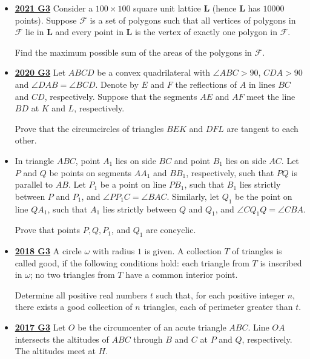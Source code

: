 \documentclass[11pt]{scrartcl}
\begin{document}
\begin{itemize}[leftmargin=*]
    Prove that the following three lines are concurrent: line $CD$, the tangent of circle $ANQ$ at point $A$, and the tangent to circle $BMP$ at point $B$.
\item \href{https://artofproblemsolving.com/community/c6h2882549p25627540}{\textbf{2021 G3}} Consider a $100\times 100$ square unit lattice $\textbf{L}$ (hence $\textbf{L}$ has $10000$ points). Suppose $\mathcal{F}$ is a set of polygons such that all vertices of polygons in $\mathcal{F}$ lie in $\textbf{L}$ and every point in $\textbf{L}$ is the vertex of exactly one polygon in $\mathcal{F}.$ 

Find the maximum possible sum of the areas of the polygons in $\mathcal{F}.$
\item \href{https://artofproblemsolving.com/community/c6h2625881p22698213}{\textbf{2020 G3}} Let $ABCD$ be a convex quadrilateral with $\angle ABC>90$, $CDA>90$ and $\angle DAB=\angle BCD$. Denote by $E$ and $F$ the reflections of $A$ in lines $BC$ and $CD$, respectively. Suppose that the segments $AE$ and $AF$ meet the line $BD$ at $K$ and $L$, respectively. 

Prove that the circumcircles of triangles $BEK$ and $DFL$ are tangent to each other.
\item {}  	In triangle $ABC$, point $A_1$ lies on side $BC$ and point $B_1$ lies on side $AC$. Let $P$ and $Q$ be points on segments $AA_1$ and $BB_1$, respectively, such that $PQ$ is parallel to $AB$. Let $P_1$ be a point on line $PB_1$, such that $B_1$ lies strictly between $P$ and $P_1$, and $\angle PP_1C=\angle BAC$. Similarly, let $Q_1$ be the point on line $QA_1$, such that $A_1$ lies strictly between $Q$ and $Q_1$, and $\angle CQ_1Q=\angle CBA$. 

Prove that points $P,Q,P_1$, and $Q_1$ are concyclic.

\newpage

\item \href{https://artofproblemsolving.com/community/c6h1876760p12752814}{\textbf{2018 G3}} A circle $\omega$ with radius $1$ is given. A collection $T$ of triangles is called good, if the following conditions hold: each triangle from $T$ is inscribed in $\omega$; no two triangles from $T$ have a common interior point. 

Determine all positive real numbers $t$ such that, for each positive integer $n$, there exists a good collection of $n$ triangles, each of perimeter greater than $t$.
\item \href{https://artofproblemsolving.com/community/c6h1671271p10632285}{\textbf{2017 G3}} Let $O$ be the circumcenter of an acute triangle $ABC$. Line $OA$ intersects the altitudes of $ABC$ through $B$ and $C$ at $P$ and $Q$, respectively. The altitudes meet at $H$. 


\end{itemize}
\end{document}
